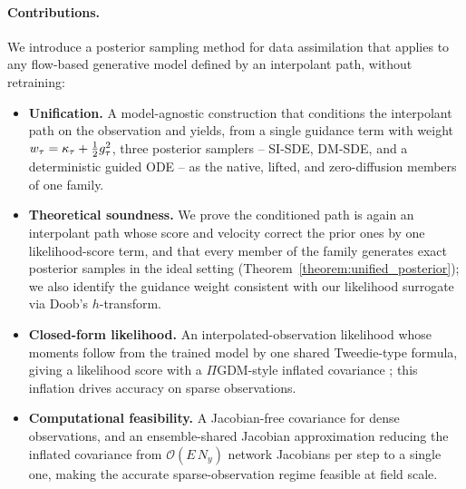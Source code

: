 \paragraph{Contributions.}
We introduce a posterior sampling method for data assimilation that applies to any flow-based generative model defined by an interpolant path, without retraining:
\begin{itemize}
    \item \textbf{Unification.} A model-agnostic construction that conditions the interpolant path on the observation and yields, from a single guidance term with weight $w_\tau=\kappa_\tau+\tfrac12g_\tau^2$, three posterior samplers -- SI-SDE, DM-SDE, and a deterministic guided ODE -- as the native, lifted, and zero-diffusion members of one family.
    \item \textbf{Theoretical soundness.} We prove the conditioned path is again an interpolant path whose score and velocity correct the prior ones by one likelihood-score term, and that every member of the family generates exact posterior samples in the ideal setting (Theorem~\ref{theorem:unified_posterior}); we also identify the guidance weight consistent with our likelihood surrogate via Doob's $h$-transform.
    \item \textbf{Closed-form likelihood.} An interpolated-observation likelihood whose moments follow from the trained model by one shared Tweedie-type formula, giving a likelihood score with a $\Pi$GDM-style inflated covariance \cite{song_pseudoinverse_2023, chung_diffusion_2023}; this inflation drives accuracy on sparse observations.
    \item \textbf{Computational feasibility.} A Jacobian-free covariance for dense observations, and an ensemble-shared Jacobian approximation reducing the inflated covariance from $\mathcal{O}(E\,N_y)$ network Jacobians per step to a single one, making the accurate sparse-observation regime feasible at field scale.
\end{itemize}
